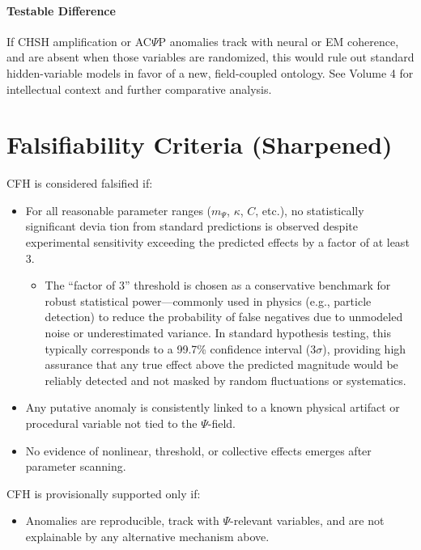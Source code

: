 \documentclass{report}
\begin{document}
\paragraph{Testable Difference}
If CHSH amplification or AC$\Psi$P anomalies track with neural or EM
coherence, and are absent when those variables are randomized, this would rule out standard
hidden-variable models in favor of a new, field-coupled ontology.
See Volume 4 for intellectual context and further comparative analysis. %

\section{Falsifiability Criteria (Sharpened)}
\label{sec:falsifiability_criteria_sharpened_cfh_main}

CFH is considered falsified if:
\begin{itemize}
    \item For all reasonable parameter ranges ($m_\Psi$, $\kappa$, $C$, etc.), no statistically significant devia tion from standard predictions is observed despite experimental sensitivity exceeding the
    predicted effects by a factor of at least 3.
        \begin{itemize}[label=\textit{Justification:}]
        \item The “factor of 3” threshold is chosen as a conservative benchmark for
        robust statistical power—commonly used in physics (e.g., particle detection) to reduce
        the probability of false negatives due to unmodeled noise or underestimated variance.
        In standard hypothesis testing, this typically corresponds to a 99.7\% confidence interval
        (3$\sigma$), providing high assurance that any true effect above the predicted magnitude would
        be reliably detected and not masked by random fluctuations or systematics.
        \end{itemize}
    \item Any putative anomaly is consistently linked to a known physical artifact or procedural
    variable not tied to the $\Psi$-field.
    \item No evidence of nonlinear, threshold, or collective effects emerges after parameter scanning.
\end{itemize}
CFH is provisionally supported only if:
\begin{itemize}
    \item Anomalies are reproducible, track with $\Psi$-relevant variables, and are not explainable by
    any alternative mechanism above.
\end{itemize}
\end{document}
